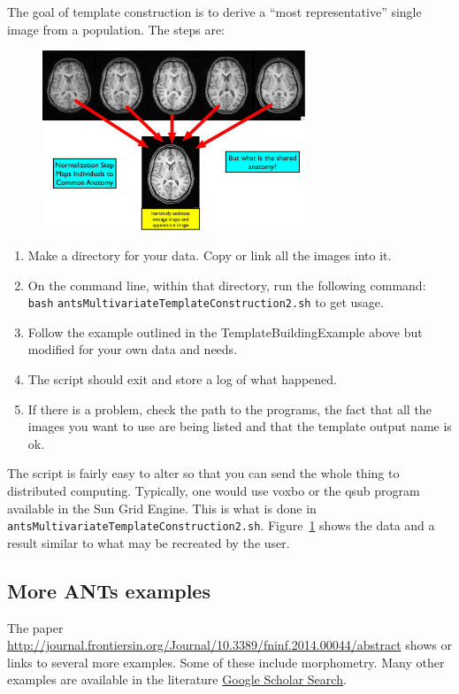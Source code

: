 \documentclass{InsightArticle}
\begin{document}
The goal of template construction is to derive a ``most representative'' single image from a population. 
The steps are: 
\begin{figure}
\center \includegraphics[width=0.7\textwidth]{Figures/templateex.jpg} 
\label{fig:template}
\end{figure}
\begin{enumerate}
\item   Make a directory for your data.   Copy or link all the images into it.
\item  On the command line, within that directory, run the following command: 
\texttt{bash}  \texttt{antsMultivariateTemplateConstruction2.sh}  to get usage. 
\item   Follow the example outlined in the TemplateBuildingExample
  above but modified for your own data and needs. 
\item The script should exit and store a log of what happened. 
\item If there is a problem, check the path to the programs, the fact that all the images you want to use are being 
listed and that the template output name is ok.  
\end{enumerate}
The script is fairly easy to alter so that you can send the whole thing to distributed computing. 
Typically, one would use voxbo or the qsub program available in the Sun Grid Engine.  This 
is what is done in \texttt{antsMultivariateTemplateConstruction2.sh}.  
Figure~\ref{fig:template} shows the data and a result similar to what may be recreated by the user.

\subsection{More ANTs examples}
The paper
\href{http://journal.frontiersin.org/Journal/10.3389/fninf.2014.00044/abstract}{http://journal.frontiersin.org/Journal/10.3389/fninf.2014.00044/abstract}
shows or links to several more examples.  Some of these include
morphometry.  
Many other examples are available in the literature \href{http://scholar.google.com/citations?user=ox-mhOkAAAAJ&hl=en}{Google
  Scholar Search}.
\end{document}
